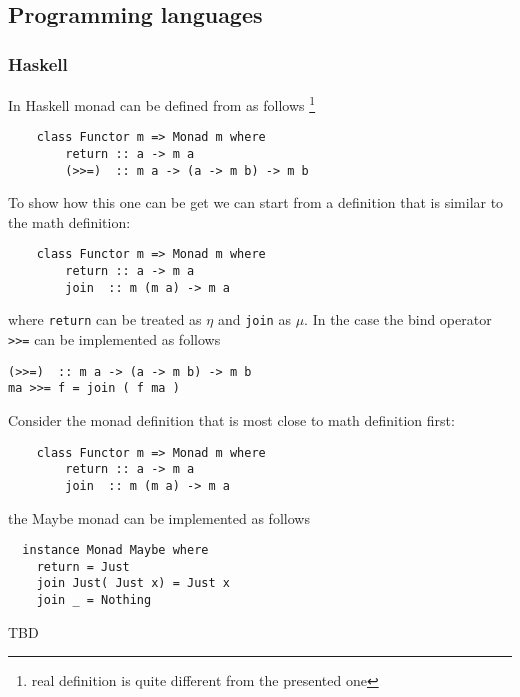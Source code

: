 \subsection{Programming languages}

\subsubsection{Haskell}

\begin{example}
\label{ex:monad_haskell}
In Haskell monad can be defined from  as follows 
\footnote{real definition is quite different from the presented one}
\begin{verbatim}
    class Functor m => Monad m where
        return :: a -> m a
        (>>=)  :: m a -> (a -> m b) -> m b
\end{verbatim} 

To show how this one can be get we can start from a definition that is
similar to the math definition:
\begin{verbatim}
    class Functor m => Monad m where
        return :: a -> m a
        join  :: m (m a) -> m a
\end{verbatim} 
where \texttt{return} can be treated as $\eta$ and 
\texttt{join} as $\mu$. In the case the bind operator 
\texttt{>>=} can be implemented as follows
\begin{verbatim}
(>>=)  :: m a -> (a -> m b) -> m b
ma >>= f = join ( f ma )
\end{verbatim} 

\end{example}

\begin{example}
\label{ex:maybe_monad_haskell}
Consider the monad definition that is most close to math definition
first:
\begin{verbatim}
    class Functor m => Monad m where
        return :: a -> m a
        join  :: m (m a) -> m a
\end{verbatim} 
the Maybe monad can be implemented as follows
\begin{verbatim}
  instance Monad Maybe where
    return = Just
    join Just( Just x) = Just x
    join _ = Nothing
\end{verbatim} 

\end{example}
TBD

